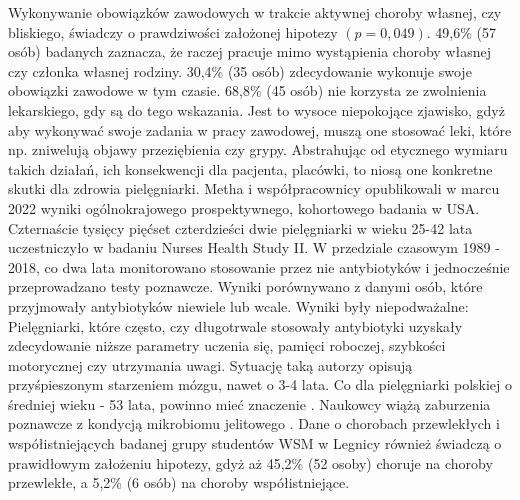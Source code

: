 \documentclass[a4paper,12pt,twoside,openright]{mwrep}
\begin{document}
Wykonywanie obowiązków zawodowych w trakcie aktywnej choroby własnej, czy bliskiego, świadczy o prawdziwości założonej hipotezy $( p=0,049)$. 49,6\% (57 osób) badanych zaznacza, że raczej pracuje mimo wystąpienia choroby własnej czy członka własnej rodziny. 30,4\% (35 osób) zdecydowanie wykonuje swoje obowiązki zawodowe w tym czasie. 68,8\% (45 osób) nie korzysta ze zwolnienia lekarskiego, gdy są do tego wskazania. Jest to wysoce niepokojące zjawisko, gdyż aby wykonywać swoje zadania w pracy zawodowej, muszą one stosować leki, które np. zniwelują objawy przeziębienia czy grypy. Abstrahując od etycznego wymiaru takich działań,  ich konsekwencji dla pacjenta, placówki, to niosą one konkretne skutki dla zdrowia pielęgniarki. Metha i współpracownicy opublikowali w marcu 2022 wyniki ogólnokrajowego prospektywnego, kohortowego badania  w USA. Czternaście tysięcy pięćset czterdzieści dwie  pielęgniarki w wieku 25-42 lata uczestniczyło w badaniu Nurses Health Study II. W przedziale czasowym 1989 - 2018,  co dwa lata monitorowano stosowanie przez nie antybiotyków i jednocześnie przeprowadzano testy poznawcze. Wyniki porównywano z danymi osób, które przyjmowały antybiotyków niewiele lub wcale. Wyniki były niepodważalne: Pielęgniarki, które często, czy długotrwale stosowały antybiotyki uzyskały zdecydowanie niższe parametry uczenia się, pamięci roboczej, szybkości motorycznej czy utrzymania uwagi. Sytuację taką autorzy opisują przyśpieszonym starzeniem mózgu, nawet o 3-4 lata.  Co dla  pielęgniarki polskiej o średniej wieku - 53 lata, powinno mieć znaczenie \cite{statystyka}.  Naukowcy  wiążą zaburzenia poznawcze z  kondycją mikrobiomu jelitowego \cite{metha}.
Dane o chorobach przewlekłych i współistniejących badanej grupy  studentów WSM w Legnicy  również  świadczą o prawidłowym założeniu hipotezy, gdyż aż 45,2\% (52 osoby) choruje na choroby przewlekłe, a 5,2\% (6 osób) na choroby współistniejące.
\end{document}
